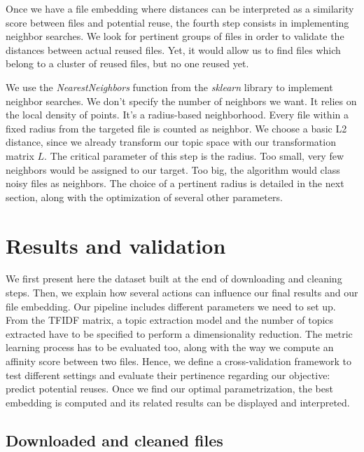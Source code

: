 \documentclass[a4paper]{article}
\begin{document}
	Once we have a file embedding where distances can be interpreted as a similarity score between files and potential reuse, the fourth step consists in implementing neighbor searches. We look for pertinent groups of files in order to validate the distances between actual reused files. Yet, it would allow us to find files which belong to a cluster of reused files, but no one reused yet.
	
	We use the \emph{NearestNeighbors} function from the \emph{sklearn} library to implement neighbor searches. We don't specify the number of neighbors we want. It relies on the local density of points. It's a radius-based neighborhood. Every file within a fixed radius from the targeted file is counted as neighbor. We choose a basic L2 distance, since we already transform our topic space with our transformation matrix $L$. The critical parameter of this step is the radius. Too small, very few neighbors would be assigned to our target. Too big, the algorithm would class noisy files as neighbors. The choice of a pertinent radius is detailed in the next section, along with the optimization of several other parameters.
	
	\section{Results and validation}
	
	We first present here the dataset built at the end of downloading and cleaning steps. Then, we explain how several actions can influence our final results and our file embedding. Our pipeline includes different parameters we need to set up. From the \ac{TFIDF} matrix, a topic extraction model and the number of topics extracted have to be specified to perform a dimensionality reduction. The metric learning process has to be evaluated too, along with the way we compute an affinity score between two files. Hence, we define a cross-validation framework to test different settings and evaluate their pertinence regarding our objective: predict potential reuses. Once we find our optimal parametrization, the best embedding is computed and its related results can be displayed and interpreted.
	
	\subsection{Downloaded and cleaned files}
	
	
\end{document}
